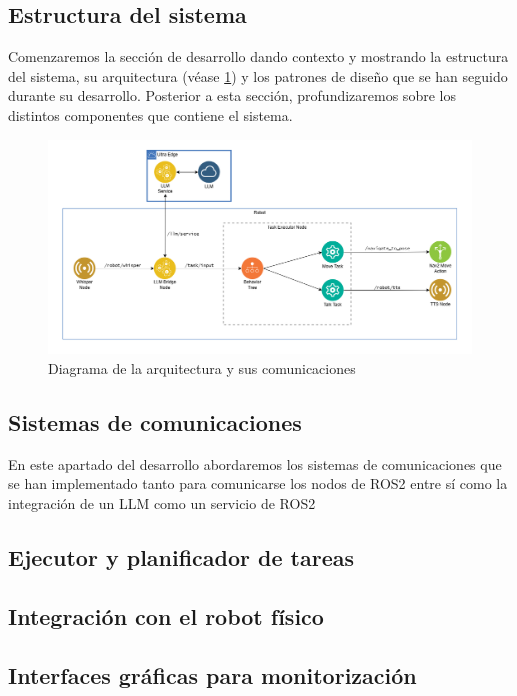 \documentclass[../main.tex]{subfiles}
\begin{document}
\subsection{Estructura del sistema}
Comenzaremos la sección de desarrollo dando contexto y mostrando la estructura del sistema, su arquitectura (véase \ref{fig:architecture_diagram}) y los patrones de diseño que se han seguido durante su desarrollo. Posterior a esta
sección, profundizaremos sobre los distintos componentes que contiene el sistema.

\begin{figure}[H]
\centering
\includegraphics[width=\textwidth]{images/architecture.png}
\caption{Diagrama de la arquitectura y sus comunicaciones}\label{fig:architecture_diagram}
\end{figure}

\subsection{Sistemas de comunicaciones}
En este apartado del desarrollo abordaremos los sistemas de comunicaciones que se han implementado tanto para comunicarse los nodos de ROS2 entre sí como la integración
de un LLM como un servicio de ROS2

\blindtext

\subsection{Ejecutor y planificador de tareas}
\blindtext

\subsection{Integración con el robot físico}
\blindtext

\subsection{Interfaces gráficas para monitorización}
\blindtext
\end{document}
